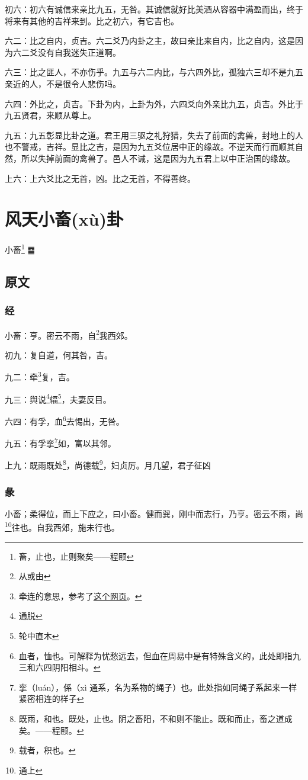 \documentclass[12pt,oneside]{book}
\begin{document}
初六：初六有诚信来亲比九五，无咎。其诚信就好比美酒从容器中满盈而出，终于将来有其他的吉祥来到。比之初六，有它吉也。

六二：比之自内，贞吉。六二爻乃内卦之主，故曰亲比来自内，比之自内，这是因为六二爻没有自我迷失正道啊。

六三：比之匪人，不亦伤乎。九五与六二内比，与六四外比，孤独六三却不是九五亲近的人，不是很令人悲伤吗。

六四：外比之，贞吉。下卦为内，上卦为外，六四爻向外亲比九五，贞吉。外比于九五贤君，来顺从尊上。

九五：九五彰显比卦之道。君王用三驱之礼狩猎，失去了前面的禽兽，封地上的人也不警戒，吉祥。显比之吉，是因为九五爻位居中正的缘故。不逆天而行而顺其自然，所以失掉前面的禽兽了。邑人不诫，这是因为九五君上以中正治国的缘故。

上六：上六爻比之无首，凶。比之无首，不得善终。



\chapter{风天小畜(xù)卦}
小畜\footnote{畜，止也，止则聚矣——程颐} {\Large ䷈}

\section{原文}

\subsection{经}
小畜：亨。密云不雨，自\footnote{从或由}我西郊。

初九：复自道，何其咎，吉。

九二：牵\footnote{牵连的意思，参考了\href{http://baike.yidao5.com/jingzhuan/xiaoxugua/6428.shtml}{这个网页}。}复，吉。

九三：舆说\footnote{通脱}辐\footnote{轮中直木}，夫妻反目。

六四：有孚，血\footnote{血者，恤也。可解释为忧愁远去，但血在周易中是有特殊含义的，此处即指九三和六四阴阳相斗。}去惕出，无咎。

九五：有孚挛\footnote{挛（luán），係（xì 通系，名为系物的绳子）也。此处指如同绳子系起来一样紧密相连的样子}如，富以其邻。

上九：既雨既处\footnote{既雨，和也。既处，止也。阴之畜阳，不和则不能止。既和而止，畜之道成矣。——程颐。}，尚德载\footnote{载者，积也。}，妇贞厉。月几望，君子征凶

\subsection{彖}
小畜；柔得位，而上下应之，曰小畜。健而巽，刚中而志行，乃亨。密云不雨，尚\footnote{通上}往也。自我西郊，施未行也。
\end{document}
